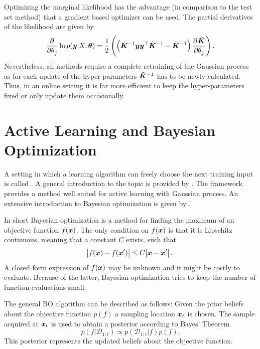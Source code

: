 Optimizing the marginal likelihood has the advantage (in comparison to the test 
set method) that a gradient based optimizer can be used. The partial derivatives 
of the likelihood are given by
\begin{equation}
    \dpd{}{\theta_j} \ln p(\vc y | X, \vc\theta) = \frac{1}{2} 
    \del{\del{\tilde{\mat K}^{-1}\vc y \vc y\Tr \tilde{\mat K}^{-1} 
            - \tilde{\mat{K}}^{-1}} \dpd{\tilde{\mat K}}{\theta_j}} \text{.}
\end{equation}
Nevertheless, all methods require a complete retraining of the Gaussian process 
as for each update of the hyper-parameters $\tilde{\bm{K}}^{-1}$ has to be newly 
calculated.  Thus, in an online setting it is far more efficient to keep the 
hyper-parameters fixed or only update them occasionally.

\section{Active Learning and Bayesian Optimization}
A setting in which a learning algorithm can freely choose the next training 
input is called . A general introduction to the topic 
is provided by \textcite{Settles:2009vo}. The  framework provides a method well suited for active 
learning with Gaussian process. An extensive introduction to Bayesian 
optimization is given by \textcite{Brochu:2010um}.

In short Bayesian optimization is a method for finding the maximum of an 
objective function $f(\bm{x})$. The only condition on $f(\bm{x})$ is that it is 
Lipschitz continuous, meaning that a constant $C$ exists, such that
\begin{equation}
    \abs{f(\bm{x}) - f(\bm{x}')} \leq C \abs{\bm{x} - \bm{x}'} \text{.}
\end{equation}
A closed form expression of $f(\bm{x})$ may be unknown and it might be costly to 
evaluate. Because of the latter, Bayesian optimization tries to keep the number 
of function evaluations small.

The general BO algorithm can be described as follows: Given the prior beliefs 
about the objective function $p(f)$ a sampling location $\bm{x}_t$ is chosen. The 
sample acquired at $\bm{x}_t$ is used to obtain a posterior according to Bayes' 
Theorem
\begin{equation}
    p(f|\mathcal{D}_{1:t}) \propto p(\mathcal{D}_{1:t} | f) p(f) \text{.}
\end{equation}
This posterior represents the updated beliefs about the objective function.

